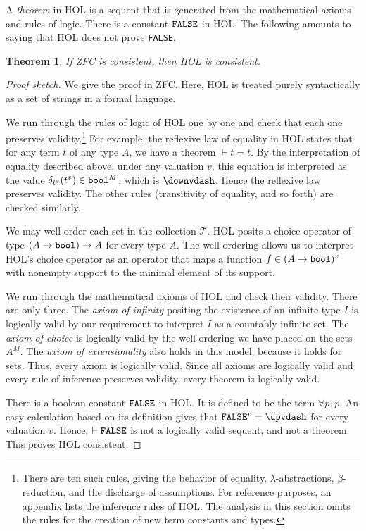\documentclass[brochure,english,12pt]{bourbaki}
\theoremstyle{plain}
\newtheorem{theorem}[equation]{Theorem}
\def\op#1{{\operatorname{#1}}}
\def\bool{\op{\tt bool}}
\def\T{{\mathcal T}}
\begin{document}
A {\it theorem} in HOL is a sequent that is generated from the
mathematical axioms and rules of logic.  There is a constant ${\tt
  FALSE}$ in HOL.  The following amounts to saying that HOL does not
prove {\tt FALSE}.

\begin{theorem} If ZFC is consistent, then HOL is consistent.
\end{theorem}

\begin{proof}[Proof sketch]
  We give the proof in ZFC.  Here, HOL is treated purely syntactically
  as a set of strings in a formal language.

  We run through the rules of logic of HOL one by one and check that
  each one preserves validity.\footnote{There are ten such rules,
    giving the behavior of equality, $\lambda$-abstractions,
    $\beta$-reduction, and the discharge of assumptions.  For
    reference purposes, an appendix lists the inference rules of HOL.
    The analysis in this section omits the rules for the creation of
    new term constants and types.} For example, the reflexive law of
  equality in HOL states that for any term $t$ of any type $A$, we
  have a theorem $\vdash t = t$.  By the interpretation of equality
  described above, under any valuation $v$, this equation is
  interpreted as the value $\delta_{t^{v}}(t^{v})\in\bool^M$, which is
  $\downvdash $.  Hence the reflexive law preserves validity.  The
  other rules (transitivity of equality, and so forth) are checked
  similarly.

  We may well-order each set in the collection $\T$.  HOL posits a
  choice operator of type $(A\to\bool)\to A$ for every type $A$.  The
  well-ordering allows us to interpret HOL's choice operator as an
  operator that maps a function $f\in (A\to\bool)^v$ with nonempty
  support to the minimal element of its support.

  We run through the mathematical axioms of HOL and check their
  validity.  There are only three.  The {\it axiom of infinity}
  positing the existence of an infinite type $I$ is logically valid by
  our requirement to interpret $I$ as a countably infinite set.  The
  {\it axiom of choice} is logically valid by the well-ordering we
  have placed on the sets $A^M$.  The {\it axiom of extensionality}
  also holds in this model, because it holds for sets.  Thus, every
  axiom is logically valid.  Since all axioms are logically valid and
  every rule of inference preserves validity, every theorem is
  logically valid.

  There is a boolean constant $\op{\tt FALSE}$ in HOL. It is defined
  to be the term $\forall p.~p$.  An easy calculation based on its definition
  gives that $\op{\tt FALSE}^v = \upvdash$ for every valuation $v$.
  Hence, $\vdash \op{\tt FALSE}$ is not a logically valid sequent, and
  not a theorem.  This proves HOL consistent.
\end{proof}
\end{document}
